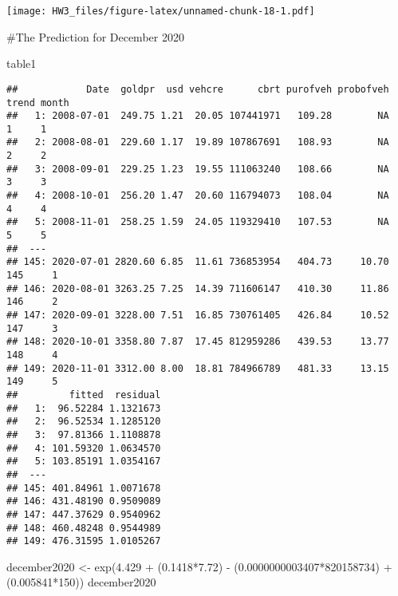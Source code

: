 \documentclass[
]{article}
\newenvironment{Shaded}{\begin{snugshade}}{\end{snugshade}}
\newcommand{\DecValTok}[1]{\textcolor[rgb]{0.00,0.00,0.81}{#1}}
\newcommand{\FloatTok}[1]{\textcolor[rgb]{0.00,0.00,0.81}{#1}}
\newcommand{\FunctionTok}[1]{\textcolor[rgb]{0.00,0.00,0.00}{#1}}
\newcommand{\NormalTok}[1]{#1}
\newcommand{\OtherTok}[1]{\textcolor[rgb]{0.56,0.35,0.01}{#1}}
\newcommand{\SpecialCharTok}[1]{\textcolor[rgb]{0.00,0.00,0.00}{#1}}
\begin{document}
\texttt{[image: HW3\_files/figure-latex/unnamed-chunk-18-1.pdf]}

\#The Prediction for December 2020

\begin{Shaded}
\begin{Highlighting}[]
\NormalTok{table1}
\end{Highlighting}
\end{Shaded}

\begin{verbatim}
##            Date  goldpr  usd vehcre      cbrt purofveh probofveh trend month
##   1: 2008-07-01  249.75 1.21  20.05 107441971   109.28        NA     1     1
##   2: 2008-08-01  229.60 1.17  19.89 107867691   108.93        NA     2     2
##   3: 2008-09-01  229.25 1.23  19.55 111063240   108.66        NA     3     3
##   4: 2008-10-01  256.20 1.47  20.60 116794073   108.04        NA     4     4
##   5: 2008-11-01  258.25 1.59  24.05 119329410   107.53        NA     5     5
##  ---                                                                        
## 145: 2020-07-01 2820.60 6.85  11.61 736853954   404.73     10.70   145     1
## 146: 2020-08-01 3263.25 7.25  14.39 711606147   410.30     11.86   146     2
## 147: 2020-09-01 3228.00 7.51  16.85 730761405   426.84     10.52   147     3
## 148: 2020-10-01 3358.80 7.87  17.45 812959286   439.53     13.77   148     4
## 149: 2020-11-01 3312.00 8.00  18.81 784966789   481.33     13.15   149     5
##         fitted  residual
##   1:  96.52284 1.1321673
##   2:  96.52534 1.1285120
##   3:  97.81366 1.1108878
##   4: 101.59320 1.0634570
##   5: 103.85191 1.0354167
##  ---                    
## 145: 401.84961 1.0071678
## 146: 431.48190 0.9509089
## 147: 447.37629 0.9540962
## 148: 460.48248 0.9544989
## 149: 476.31595 1.0105267
\end{verbatim}

\begin{Shaded}
\begin{Highlighting}[]
\NormalTok{december2020 }\OtherTok{\textless{}{-}} \FunctionTok{exp}\NormalTok{(}\FloatTok{4.429} \SpecialCharTok{+}\NormalTok{ (}\FloatTok{0.1418}\SpecialCharTok{*}\FloatTok{7.72}\NormalTok{) }\SpecialCharTok{{-}}\NormalTok{ (}\FloatTok{0.0000000003407}\SpecialCharTok{*}\DecValTok{820158734}\NormalTok{) }\SpecialCharTok{+}\NormalTok{ (}\FloatTok{0.005841}\SpecialCharTok{*}\DecValTok{150}\NormalTok{))}
\NormalTok{december2020}
\end{Highlighting}
\end{Shaded}
\end{document}
